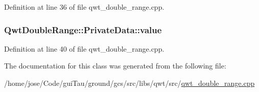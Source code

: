Definition at line 36 of file qwt\-\_\-double\-\_\-range.\-cpp.

\hypertarget{class_qwt_double_range_1_1_private_data_a09e0464ee1692e85f01f330be0953fd1}{
\subsubsection[{value}]{ Qwt\-Double\-Range\-::\-Private\-Data\-::value}}\label{class_qwt_double_range_1_1_private_data_a09e0464ee1692e85f01f330be0953fd1}


Definition at line 40 of file qwt\-\_\-double\-\_\-range.\-cpp.



The documentation for this class was generated from the following file\-:\begin{DoxyCompactItemize}
\item 
/home/jose/\-Code/gui\-Tau/ground/gcs/src/libs/qwt/src/\hyperlink{qwt__double__range_8cpp}{qwt\-\_\-double\-\_\-range.\-cpp}\end{DoxyCompactItemize}

